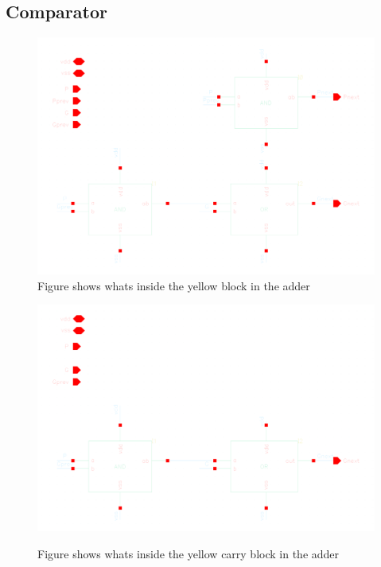 \subsection{Comparator}

\begin{figure}[H]
  \centering
  \captionsetup{justification=centering}
  \includegraphics[clip,width=1.0\textwidth]{../figures/yellow}
  \caption{Figure shows whats inside the yellow block in the adder} \label{fig:yellow}
\end{figure}

\begin{figure}[H]
  \centering
  \captionsetup{justification=centering}
  {\includegraphics[width=1.0\textwidth]{../figures/yellow_carry}}
  \caption{Figure shows whats inside the yellow carry block in the adder} \label{fig:yellow_c}
\end{figure}

